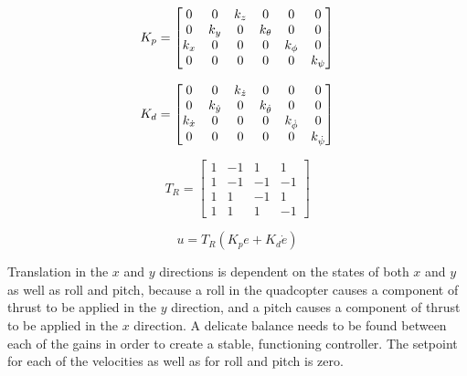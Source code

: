 \documentclass[letterpaper, 10 pt, conference]{ieeeconf}  %
\begin{document}
\begin{equation} \label{eq:gain_matrix_p}
K_{p} =
\setcounter{MaxMatrixCols}{12}
\begin{bmatrix}
0 & 0 & k_{z} & 0 & 0 & 0 \\
0 & k_{y} & 0 & k_{\theta} & 0 & 0\\
k_{x} & 0 & 0 & 0 & k_{\phi} & 0 \\
0 & 0 & 0 & 0 & 0 & k_{\psi}
\end{bmatrix}
\end{equation}

\begin{equation} \label{eq:gain_matrix_d}
K_{d} =
\setcounter{MaxMatrixCols}{12}
\begin{bmatrix}
0 & 0 & k_{\dot{z}} & 0 & 0 & 0 \\
0 & k_{\dot{y}} & 0 & k_{\dot{\theta}} & 0 & 0\\
k_{\dot{x}} & 0 & 0 & 0 & k_{\dot{\phi}} & 0 \\
0 & 0 & 0 & 0 & 0 & k_{\dot{\psi}}
\end{bmatrix}
\end{equation}

\begin{equation} \label{eq:rotor_transform}
T_{R} = 
\begin{bmatrix}
1 & -1 & 1 & 1 \\
1 & -1 & -1 & -1 \\
1 & 1 & -1 & 1 \\
1 & 1 & 1 & -1
\end{bmatrix}
\end{equation}

\begin{equation} \label{eq:control_equation}
u = T_{R}(K_{p}e + K_{d}\dot{e})
\end{equation}

Translation in the $x$ and $y$ directions is dependent on the states of both $x$ and $y$ as well as roll and pitch, because a roll in the quadcopter causes a component of thrust to be applied in the $y$ direction, and a pitch causes a component of thrust to be applied in the $x$ direction.
A delicate balance needs to be found between each of the gains in order to create a stable, functioning controller. 
The setpoint for each of the velocities as well as for roll and pitch is zero.

\end{document}
